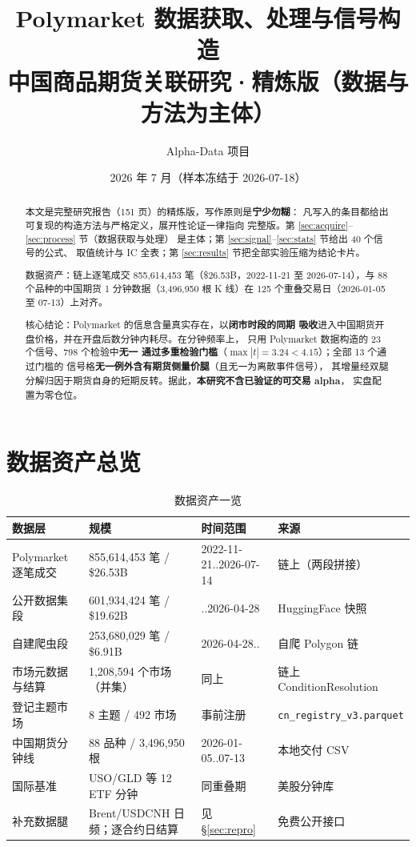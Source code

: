 \documentclass[11pt, a4paper]{ctexart}
\title{\bfseries Polymarket 数据获取、处理与信号构造\\
\large 中国商品期货关联研究·精炼版（数据与方法为主体）}
\author{Alpha-Data 项目}
\date{2026 年 7 月（样本冻结于 2026-07-18）}
\newcommand{\code}[1]{\texttt{\small #1}}
\begin{document}
\maketitle

\begin{abstract}
\noindent
本文是完整研究报告（151 页）的精炼版，写作原则是\textbf{宁少勿糊}：
凡写入的条目都给出可复现的构造方法与严格定义，展开性论证一律指向
完整版。第 \ref{sec:acquire}--\ref{sec:process} 节（数据获取与处理）
是主体；第 \ref{sec:signal}--\ref{sec:stats} 节给出 40 个信号的公式、
取值统计与 IC 全表；第 \ref{sec:results} 节把全部实验压缩为结论卡片。

数据资产：链上逐笔成交 855{,}614{,}453 笔（\$26.53B，2022-11-21 至
2026-07-14），与 88 个品种的中国期货 1 分钟数据（3{,}496{,}950 根
K 线）在 125 个重叠交易日（2026-01-05 至 07-13）上对齐。

核心结论：Polymarket 的信息含量真实存在，以\textbf{闭市时段的同期
吸收}进入中国期货开盘价格，并在开盘后数分钟内耗尽。在分钟频率上，
只用 Polymarket 数据构造的 23 个信号、798 个检验中\textbf{无一
通过多重检验门槛}（$\max|t|=3.24 < 4.15$）；全部 13 个通过门槛的
信号格\textbf{无一例外含有期货侧量价腿}（且无一为离散事件信号），
其增量经双腿分解归因于期货自身的短期反转。据此，\textbf{本研究不含已验证的可交易 alpha}，
实盘配置为零仓位。
\end{abstract}

\tableofcontents

\section{数据资产总览}

\begin{table}[h!]\centering\footnotesize
\caption{数据资产一览}\label{tab:assets}
\setlength{\tabcolsep}{4pt}
\begin{tabular}{llll}
\toprule
数据层 & 规模 & 时间范围 & 来源 \\
\midrule
Polymarket 逐笔成交 & 855{,}614{,}453 笔 / \$26.53B & 2022-11-21..2026-07-14 & 链上（两段拼接） \\
\quad 公开数据集段 & 601{,}934{,}424 笔 / \$19.62B & ..2026-04-28 & HuggingFace 快照 \\
\quad 自建爬虫段 & 253{,}680{,}029 笔 / \$6.91B & 2026-04-28.. & 自爬 Polygon 链 \\
市场元数据与结算 & 1{,}208{,}594 个市场（并集） & 同上 & 链上 ConditionResolution \\
登记主题市场 & 8 主题 / 492 市场 & 事前注册 & \code{cn\_registry\_v3.parquet} \\
中国期货分钟线 & 88 品种 / 3{,}496{,}950 根 & 2026-01-05..07-13 & 本地交付 CSV \\
国际基准 & USO/GLD 等 12 ETF 分钟 & 同重叠期 & 美股分钟库 \\
补充数据腿 & Brent/USDCNH 日频；逐合约日结算 & 见 \S\ref{sec:repro} & 免费公开接口 \\
\bottomrule
\end{tabular}
\end{table}
\end{document}
